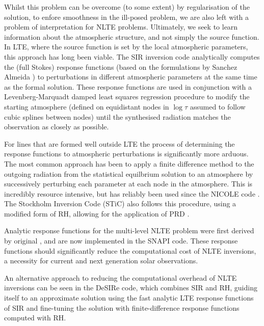 Whilst this problem can be overcome (to some extent) by regularisation of the solution, to enfore smoothness in the ill-posed problem, we are also left with a problem of interpretation for NLTE problems.
Ultimately, we seek to learn information about the atmospheric structure, and not simply the source function.
In LTE, where the source function is set by the local atmospheric parameters, this approach has long been viable.
The SIR inversion code \citep{1992RuizCobo} analytically computes the (full Stokes) response functions (based on the formulations by Sanchez Almeida \NeedRef{}) to perturbations in different atmospheric parameters at the same time as the formal solution.
These response functions are used in conjunction with a Levenberg-Marquadt damped least squares regression procedure to modify the starting atmosphere (defined on equidistant nodes in $\log \tau$ assumed to follow cubic splines between nodes) until the synthesised radiation matches the observation as closely as possible.

For lines that are formed well outside LTE the process of determining the response functions to atmospheric perturbations is significantly more arduous.
The most common approach has been to apply a finite difference method to the outgoing radiation from the statistical equilbrium solution to an atmosphere by successively perturbing each parameter at each node in the atmosphere.
This is incredibly resource intensive, but has reliably been used since the NICOLE code \citep[first distributed 2000]{Socas-Navarro2015}.
The Stockholm Inversion Code (STiC) also follows this procedure, using a modified form of RH, allowing for the application of PRD \citep{2019dlcr}.

Analytic response functions for the multi-level NLTE problem were first derived by \NeedRef{} original \citet{Milic2018}, and are now implemented in the SNAPI code.
These response functions should significantly reduce the computational cost of NLTE inversions, a necessity for current and next generation solar observations.

An alternative approach to reducing the computational overhead of NLTE inversions can be seen in the DeSIRe code, which combines SIR and RH, guiding itself to an approximate solution using the fast analytic LTE response functions of SIR and fine-tuning the solution with finite-difference response functions computed with RH. \NeedRef{}

